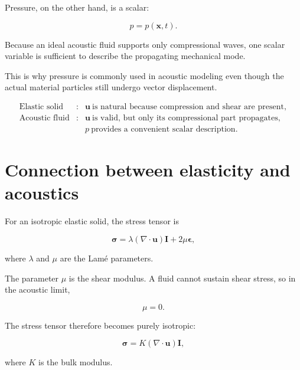 \documentclass[11pt]{article}
\begin{document}
Pressure, on the other hand, is a scalar:

\begin{equation}
    p=p(\bm{x},t).
\end{equation}

Because an ideal acoustic fluid supports only compressional waves, one scalar variable is sufficient to describe the propagating mechanical mode.

This is why pressure is commonly used in acoustic modeling even though the actual material particles still undergo vector displacement.

\begin{tcolorbox}[title=Useful comparison]
\[
\boxed{
\begin{array}{ccl}
\text{Elastic solid}
&:&
\bm{u}\ \text{is natural because compression and shear are present},
\\[2mm]
\text{Acoustic fluid}
&:&
\bm{u}\ \text{is valid, but only its compressional part propagates},
\\[2mm]
&&
p\ \text{provides a convenient scalar description}.
\end{array}
}
\]
\end{tcolorbox}

\section{Connection between elasticity and acoustics}

For an isotropic elastic solid, the stress tensor is

\begin{equation}
    \bm{\sigma}
    =
    \lambda(\nabla\cdot\bm{u})\bm{I}
    +
    2\mu\bm{\epsilon},
\end{equation}

where $\lambda$ and $\mu$ are the Lam\'e parameters.

The parameter $\mu$ is the shear modulus. A fluid cannot sustain shear stress, so in the acoustic limit,

\begin{equation}
    \mu=0.
\end{equation}

The stress tensor therefore becomes purely isotropic:

\begin{equation}
    \bm{\sigma}
    =
    K(\nabla\cdot\bm{u})\bm{I},
\end{equation}

where $K$ is the bulk modulus.
\end{document}
